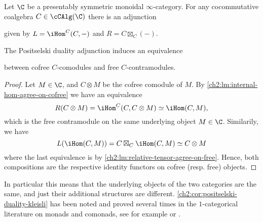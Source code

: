 \begin{theorem}
    Let $\C$ be a presentably symmetric monoidal $\infty$-category. For any cocommutative coalgebra $C\in \cCAlg(\C)$ there is an adjunction 
    \begin{center}
    \end{center}
    given by $L = \iHom^C(C,-)$ and $R = C\boxtimes_C (-)$. 
\end{theorem}


\begin{corollary}
    The Positselski duality adjunction induces an equivalence
    \begin{center}
    \end{center}
    between cofree $C$-comodules and free $C$-contramodules. 
\end{corollary}
\begin{proof}
    Let $M\in \C$, and $C\otimes M$ be the cofree comodule of $M$. By \cref{ch2:lm:internal-hom-agree-on-cofree} we have an equivalence 
    \[R(C\otimes M) = \iHom^C(C, C\otimes M)\simeq \iHom(C, M),\]
    which is the free contramodule on the same underlying object $M\in \C$. Similarily, we have 
    \[L(\iHom(C, M))= C\boxtimes_C \iHom(C, M) \simeq C\otimes M\] 
    where the last equivalence is by \cref{ch2:lm:relative-tensor-agree-on-free}. Hence, both compositions are the respective identity functors on cofree (resp. free) objects. 
\end{proof}

\begin{remark}
    In particular this means that the underlying objects of the two categories are the same, and just their additional structures are different. \cref{ch2:cor:positselski-duality-kleisli} has been noted and proved several times in the $1$-categorical literature on monads and comonads, see for example \cite[Theorem 3]{kleiner_1990} or \cite[2.5]{bohm-brzezinski-wisbauer_2009}. 
\end{remark}



